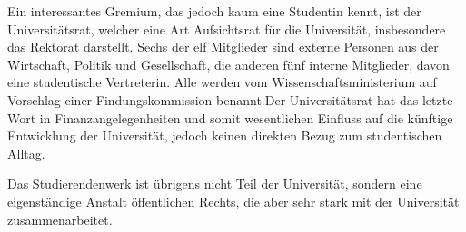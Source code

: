 Ein interessantes Gremium, das jedoch kaum eine Studentin kennt, ist der Universitätsrat, welcher eine Art Aufsichtsrat für die Universität, insbesondere das Rektorat darstellt. Sechs der elf Mitglieder sind externe Personen aus der Wirtschaft, Politik und Gesellschaft, die anderen fünf interne Mitglieder, davon eine studentische Vertreterin. Alle werden vom Wissenschaftsministerium auf Vorschlag einer Findungskommission benannt.Der Universitätsrat hat das letzte Wort in Finanzangelegenheiten und somit wesentlichen Einfluss auf die künftige Entwicklung der Universität, jedoch keinen direkten Bezug zum studentischen Alltag.



Das Studierendenwerk ist übrigens nicht Teil der Universität, sondern eine eigenständige Anstalt öffentlichen Rechts, die aber sehr stark mit der Universität zusammenarbeitet.

